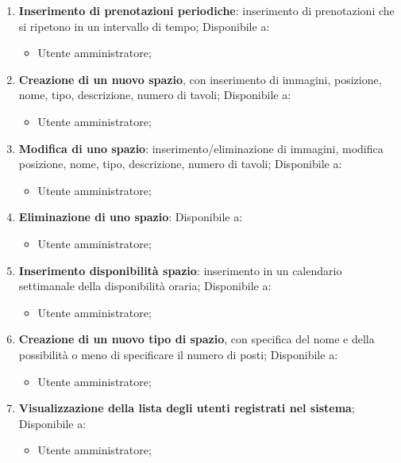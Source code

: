 \begin{enumerate}
    \item \textbf{Inserimento di prenotazioni periodiche}: inserimento di
    prenotazioni che si ripetono in un intervallo di tempo; Disponibile a:
        \begin{itemize}
            \item Utente amministratore;
        \end{itemize}

    \item \textbf{Creazione di un nuovo spazio}, con inserimento di immagini,
    posizione, nome, tipo, descrizione, numero di tavoli; Disponibile a:
        \begin{itemize}
            \item Utente amministratore;
        \end{itemize}

    \item \textbf{Modifica di uno spazio}: inserimento/eliminazione di immagini,
    modifica posizione, nome, tipo, descrizione, numero di tavoli; Disponibile
    a:
        \begin{itemize}
            \item Utente amministratore;
        \end{itemize}

    \item \textbf{Eliminazione di uno spazio}: Disponibile a:
        \begin{itemize}
            \item Utente amministratore;
        \end{itemize}

    \item \textbf{Inserimento disponibilità spazio}: inserimento in un
    calendario settimanale della disponibilità oraria; Disponibile a:
        \begin{itemize}
            \item Utente amministratore;
        \end{itemize}

    \item \textbf{Creazione di un nuovo tipo di spazio}, con specifica del nome
    e della possibilità o meno di specificare il numero di posti; Disponibile
    a:
    \begin{itemize}
            \item Utente amministratore;
        \end{itemize}

    \item \textbf{Visualizzazione della lista degli utenti registrati nel
    sistema}; Disponibile a:
        \begin{itemize}
            \item Utente amministratore;
        \end{itemize}


\end{enumerate}
